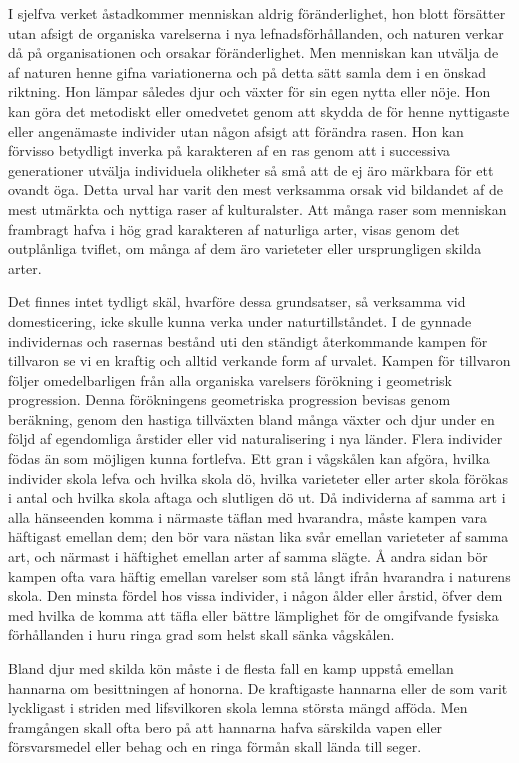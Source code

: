 I sjelfva verket åstadkommer menniskan aldrig föränderlighet, hon blott försätter utan afsigt de organiska varelserna i nya lefnadsförhållanden, och naturen verkar då på organisationen och orsakar föränderlighet. Men menniskan kan utvälja de af naturen henne gifna variationerna och på detta sätt samla dem i en önskad riktning. Hon lämpar således djur och växter för sin egen nytta eller nöje. Hon kan göra det metodiskt eller omedvetet genom att skydda de för henne nyttigaste eller angenämaste individer utan någon afsigt att förändra rasen. Hon kan förvisso betydligt inverka på karakteren af en ras genom att i successiva generationer utvälja individuela olikheter så små att de ej äro märkbara för ett ovandt öga. Detta urval har varit den mest verksamma orsak vid bildandet af de mest utmärkta och nyttiga raser af kulturalster. Att många raser som menniskan frambragt hafva i hög grad karakteren af naturliga arter, visas genom det outplånliga tviflet, om många af dem äro varieteter eller ursprungligen skilda arter.

Det finnes intet tydligt skäl, hvarföre dessa grundsatser, så verksamma vid domesticering, icke skulle kunna verka under naturtillståndet. I de gynnade individernas och rasernas bestånd uti den ständigt återkommande kampen för tillvaron se vi en kraftig och alltid verkande form af urvalet. Kampen för tillvaron följer omedelbarligen från alla organiska varelsers förökning i geometrisk progression. Denna förökningens geometriska progression bevisas genom beräkning, genom den hastiga tillväxten bland många växter och djur under en följd af egendomliga årstider eller vid naturalisering i nya länder. Flera individer födas än som möjligen kunna fortlefva. Ett gran i vågskålen kan afgöra, hvilka individer skola lefva och hvilka skola dö, hvilka varieteter eller arter skola förökas i antal och hvilka skola aftaga och slutligen dö ut. Då individerna af samma art i alla hänseenden komma i närmaste täflan med hvarandra, måste kampen vara häftigast emellan dem; den bör vara nästan lika svår emellan varieteter af samma art, och närmast i häftighet emellan arter af samma slägte. Å andra sidan bör kampen ofta vara häftig emellan varelser som stå långt ifrån hvarandra i naturens skola. Den minsta fördel hos vissa individer, i någon ålder eller årstid, öfver dem med hvilka de komma att täfla eller bättre lämplighet för de omgifvande fysiska förhållanden i huru ringa grad som helst skall sänka vågskålen.

Bland djur med skilda kön måste i de flesta fall en kamp uppstå emellan hannarna om besittningen af honorna. De kraftigaste hannarna eller de som varit lyckligast i striden med lifsvilkoren skola lemna största mängd afföda. Men framgången skall ofta bero på att hannarna hafva särskilda vapen eller försvarsmedel eller behag och en ringa förmån skall lända till seger.

